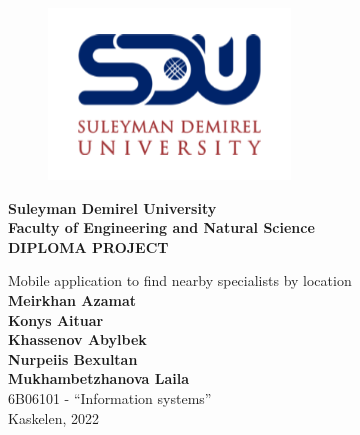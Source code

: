 \begin{titlepage}
\begin{center}
\vspace{1cm}
\begin{figure}[h]
    \centering
    \includegraphics[scale=0.55]{images/sdulogo2.png}
\end{figure}
\vspace{-0,3cm}

\textbf{Suleyman Demirel University \\
Faculty of Engineering and Natural Science}\\

\vspace{4cm}
\Large
\textbf{DIPLOMA PROJECT}\\
\vspace{0,5cm}
\normalsize

Mobile application to find nearby specialists by location\\
\vspace{0,5cm}
\textbf{Meirkhan Azamat \\ Konys Aituar \\ Khassenov Abylbek \\  Nurpeiis Bexultan \\ Mukhambetzhanova Laila }\\
\vspace{0,5cm}
6B06101 - \textquotedblleft Information systems\textquotedblright\\

\vfill
Kaskelen, 2022

\end{center}
\end{titlepage}